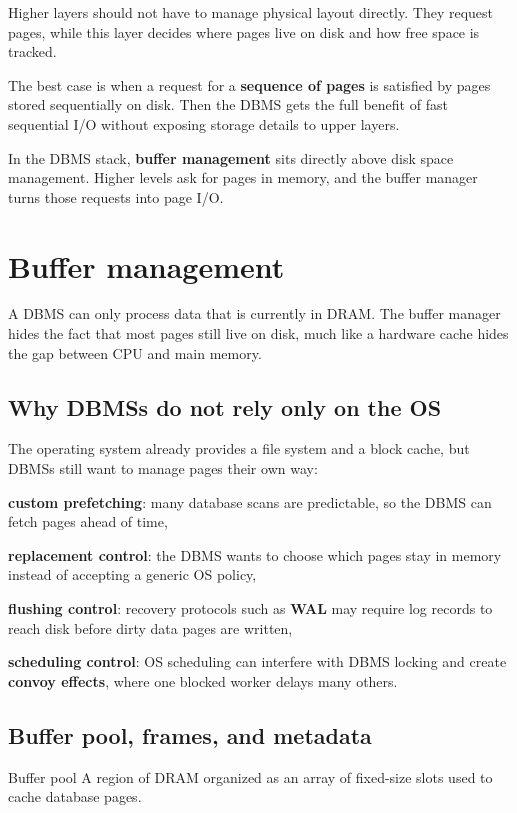 \documentclass[../../dis.tex]{subfiles}
\begin{document}
Higher layers should not have to manage physical layout directly. They request pages, while this layer decides where pages live on disk and how free space is tracked.

The best case is when a request for a \textbf{sequence of pages} is satisfied by pages stored sequentially on disk. Then the DBMS gets the full benefit of fast sequential I/O without exposing storage details to upper layers.

In the DBMS stack, \textbf{buffer management} sits directly above disk space management. Higher levels ask for pages in memory, and the buffer manager turns those requests into page I/O.

\section{Buffer management}
A DBMS can only process data that is currently in DRAM. The buffer manager hides the fact that most pages still live on disk, much like a hardware cache hides the gap between CPU and main memory.

\begin{schema}
{}\par}
\end{schema}

\subsection{Why DBMSs do not rely only on the OS}
The operating system already provides a file system and a block cache, but DBMSs still want to manage pages their own way:
\begin{dashlist}
    \item \textbf{custom prefetching}: many database scans are predictable, so the DBMS can fetch pages ahead of time,
    \item \textbf{replacement control}: the DBMS wants to choose which pages stay in memory instead of accepting a generic OS policy,
    \item \textbf{flushing control}: recovery protocols such as \textbf{WAL} may require log records to reach disk before dirty data pages are written,
    \item \textbf{scheduling control}: OS scheduling can interfere with DBMS locking and create \textbf{convoy effects}, where one blocked worker delays many others.
\end{dashlist}

\subsection{Buffer pool, frames, and metadata}
\begin{concept}{Buffer pool}
A region of DRAM organized as an array of fixed-size slots used to cache database pages.
\end{concept}
\end{document}
